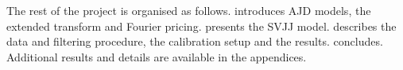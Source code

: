 The rest of the project is organised as follows.  introduces AJD models, the
extended transform and Fourier pricing.  presents the SVJJ model.
 describes the data and filtering procedure, the calibration setup and
the results.  concludes. Additional results and details are available in the
appendices.
